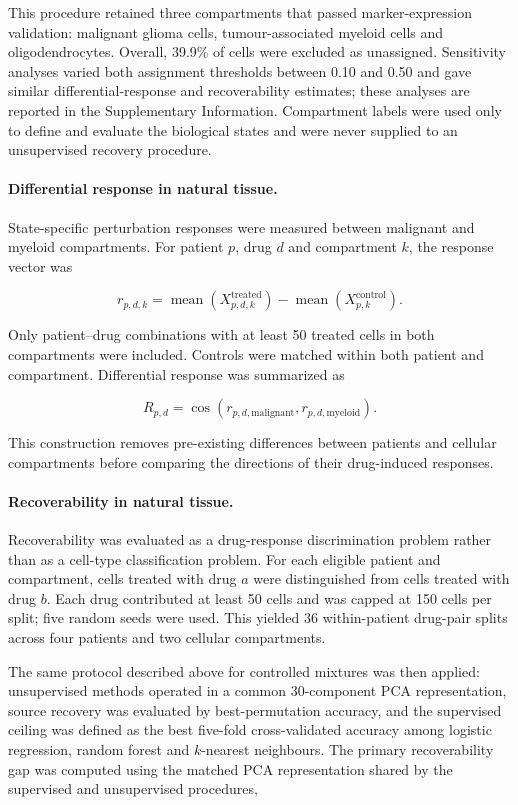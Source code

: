 \documentclass[11pt,letterpaper]{article}
\begin{document}
This procedure retained three compartments that passed marker-expression validation: malignant
glioma cells, tumour-associated myeloid cells and oligodendrocytes. Overall, 39.9\% of cells were
excluded as unassigned. Sensitivity analyses varied both assignment thresholds between 0.10 and
0.50 and gave similar differential-response and recoverability estimates; these analyses are
reported in the Supplementary Information. Compartment labels were used only to define and
evaluate the biological states and were never supplied to an unsupervised recovery procedure.

\paragraph{Differential response in natural tissue.}
State-specific perturbation responses were measured between malignant and myeloid compartments.
For patient $p$, drug $d$ and compartment $k$, the response vector was

$$
r_{p,d,k}
=
\operatorname{mean}
\left(
X^{\mathrm{treated}}_{p,d,k}
\right)
-
\operatorname{mean}
\left(
X^{\mathrm{control}}_{p,k}
\right).
$$

Only patient--drug combinations with at least 50 treated cells in both compartments were included.
Controls were matched within both patient and compartment. Differential response was summarized as

$$
R_{p,d}
=
\cos
\left(
r_{p,d,\mathrm{malignant}},
r_{p,d,\mathrm{myeloid}}
\right).
$$

This construction removes pre-existing differences between patients and cellular compartments
before comparing the directions of their drug-induced responses.

\paragraph{Recoverability in natural tissue.}
Recoverability was evaluated as a drug-response discrimination problem rather than as a cell-type
classification problem. For each eligible patient and compartment, cells treated with drug $a$
were distinguished from cells treated with drug $b$. Each drug contributed at least 50 cells and
was capped at 150 cells per split; five random seeds were used. This yielded 36 within-patient
drug-pair splits across four patients and two cellular compartments.

The same protocol described above for controlled mixtures was then applied: unsupervised methods
operated in a common 30-component PCA representation, source recovery was evaluated by
best-permutation accuracy, and the supervised ceiling was defined as the best five-fold
cross-validated accuracy among logistic regression, random forest and $k$-nearest neighbours.
The primary recoverability gap was computed using the matched PCA representation shared by the
supervised and unsupervised procedures,
\end{document}
